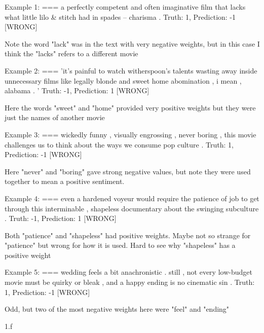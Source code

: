 \begin{answer}
  Example 1:
=== a perfectly competent and often imaginative film that lacks what little lilo \& stitch had in spades -- charisma .
Truth: 1, Prediction: -1 [WRONG]

Note the word "lack" was in the text with very negative weights, but in this case I think the "lacks" refers to a different movie


Example 2:
=== 'it's painful to watch witherspoon's talents wasting away inside unnecessary films like legally blonde and sweet home abomination , i mean , alabama . '
Truth: -1, Prediction: 1 [WRONG]


Here the words "sweet" and "home" provided very positive weights but they were just the names of another movie


Example 3:
=== wickedly funny , visually engrossing , never boring , this movie challenges us to think about the ways we consume pop culture .
Truth: 1, Prediction: -1 [WRONG]

Here "never" and "boring" gave strong negative values, but note they were used together to mean a positive sentiment.


Example 4:
=== even a hardened voyeur would require the patience of job to get through this interminable , shapeless documentary about the swinging subculture .
Truth: -1, Prediction: 1 [WRONG]

Both "patience" and "shapeless" had positive weights.  Maybe not so strange for "patience" but wrong for how it is used.
Hard to see why "shapeless" has a positive weight

Example 5:
=== wedding feels a bit anachronistic . still , not every low-budget movie must be quirky or bleak , and a happy ending is no cinematic sin .
Truth: 1, Prediction: -1 [WRONG]

Odd, but two of the most negative weights here were "feel" and "ending"

  
\end{answer}
\clearpage

\LARGE
1.f
\normalsize

\begin{answer}
\end{answer}
\clearpage



